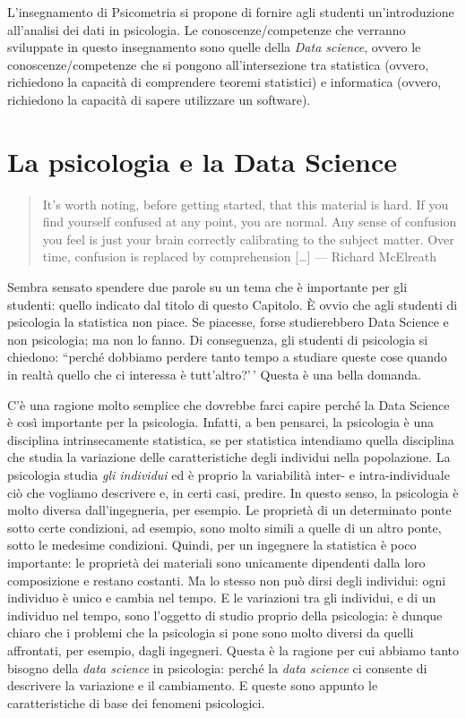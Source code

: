 \documentclass[
  10pt,
  italian,
  a4paper,
  extrafontsizes,onecolumn,openright
  ]{memoir}
\theoremstyle{definition}
\theoremstyle{definition}
\theoremstyle{definition}
\theoremstyle{definition}
\theoremstyle{remark}
\begin{document}
L'insegnamento di Psicometria si propone di fornire agli studenti un'introduzione all'analisi dei dati in psicologia.
Le conoscenze/competenze che verranno sviluppate in questo insegnamento sono quelle della \emph{Data science}, ovvero le conoscenze/competenze che si pongono all'intersezione tra statistica (ovvero, richiedono la capacità di comprendere teoremi statistici) e informatica (ovvero, richiedono la capacità di sapere utilizzare un software).

\hypertarget{la-psicologia-e-la-data-science}{%
\section*{La psicologia e la Data Science}\label{la-psicologia-e-la-data-science}}

\begin{quote}
It's worth noting, before getting started, that this material is hard. If you find yourself confused at any point, you are normal. Any sense of confusion you feel is just your brain correctly calibrating to the subject matter. Over time, confusion is replaced by comprehension {[}\ldots{]} --- Richard McElreath
\end{quote}

Sembra sensato spendere due parole su un tema che è importante per gli studenti: quello indicato dal titolo di questo Capitolo. È ovvio che agli studenti di psicologia la statistica non piace. Se piacesse, forse studierebbero Data Science e non psicologia; ma non lo fanno. Di conseguenza, gli studenti di psicologia si chiedono: ``perché dobbiamo perdere tanto tempo a studiare queste cose quando in realtà quello che ci interessa è tutt'altro?'\,' Questa è una bella domanda.

C'è una ragione molto semplice che dovrebbe farci capire perché la Data Science è così importante per la psicologia. Infatti, a ben pensarci, la psicologia è una disciplina intrinsecamente statistica, se per statistica intendiamo quella disciplina che studia la variazione delle caratteristiche degli individui nella popolazione. La psicologia studia \emph{gli individui} ed è proprio la variabilità inter- e intra-individuale ciò che vogliamo descrivere e, in certi casi, predire. In questo senso, la psicologia è molto diversa dall'ingegneria, per esempio. Le proprietà di un determinato ponte sotto certe condizioni, ad esempio, sono molto simili a quelle di un altro ponte, sotto le medesime condizioni. Quindi, per un ingegnere la statistica è poco importante: le proprietà dei materiali sono unicamente dipendenti dalla loro composizione e restano costanti. Ma lo stesso non può dirsi degli individui: ogni individuo è unico e cambia nel tempo. E le variazioni tra gli individui, e di un individuo nel tempo, sono l'oggetto di studio proprio della psicologia: è dunque chiaro che i problemi che la psicologia si pone sono molto diversi da quelli affrontati, per esempio, dagli ingegneri. Questa è la ragione per cui abbiamo tanto bisogno della \emph{data science} in psicologia: perché la \emph{data science} ci consente di descrivere la variazione e il cambiamento. E queste sono appunto le caratteristiche di base dei fenomeni psicologici.
\end{document}

